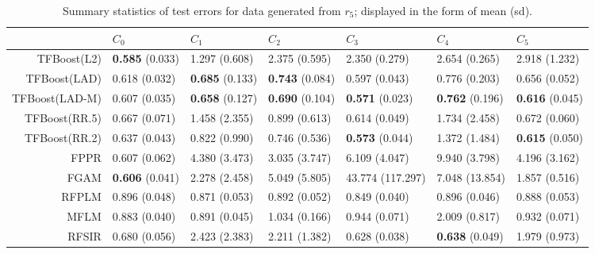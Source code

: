 \begin{table}[H]
\centering
\footnotesize
\begin{tabular}{rllllll}
  \hline
 & $C_0$ & $C_1$ & $C_2$ & $C_3$ & $C_4$ & $C_5$ \\ 
  \hline
TFBoost(L2) & \textbf{0.585} (0.033) & 1.297 (0.608) & 2.375 (0.595) & 2.350 (0.279) & 2.654 (0.265) & 2.918 (1.232) \\ 
  TFBoost(LAD) & 0.618 (0.032) & \textbf{0.685} (0.133) & \textbf{0.743} (0.084) & 0.597 (0.043) & 0.776 (0.203) & 0.656 (0.052) \\ 
  TFBoost(LAD-M) & 0.607 (0.035) & \textbf{0.658} (0.127) & \textbf{0.690} (0.104) & \textbf{0.571} (0.023) & \textbf{0.762} (0.196) & \textbf{0.616} (0.045) \\ 
  TFBoost(RR.5) & 0.667 (0.071) & 1.458 (2.355) & 0.899 (0.613) & 0.614 (0.049) & 1.734 (2.458) & 0.672 (0.060) \\ 
  TFBoost(RR.2) & 0.637 (0.043) & 0.822 (0.990) & 0.746 (0.536) & \textbf{0.573} (0.044) & 1.372 (1.484) & \textbf{0.615} (0.050) \\ 
  FPPR & 0.607 (0.062) & 4.380 (3.473) & 3.035 (3.747) & 6.109 (4.047) & 9.940 (3.798) & 4.196 (3.162) \\ 
  FGAM & \textbf{0.606} (0.041) & 2.278 (2.458) & 5.049 (5.805) & 43.774 (117.297) & 7.048 (13.854) & 1.857 (0.516) \\ 
  RFPLM & 0.896 (0.048) & 0.871 (0.053) & 0.892 (0.052) & 0.849 (0.040) & 0.896 (0.046) & 0.888 (0.053) \\ 
  MFLM & 0.883 (0.040) & 0.891 (0.045) & 1.034 (0.166) & 0.944 (0.071) & 2.009 (0.817) & 0.932 (0.071) \\ 
  RFSIR & 0.680 (0.056) & 2.423 (2.383) & 2.211 (1.382) & 0.628 (0.038) & \textbf{0.638} (0.049) & 1.979 (0.973) \\ 
   \hline
\end{tabular}
\caption{Summary statistics of test errors for data generated from $r_5$; displayed in the form of mean (sd).} 
\end{table}
